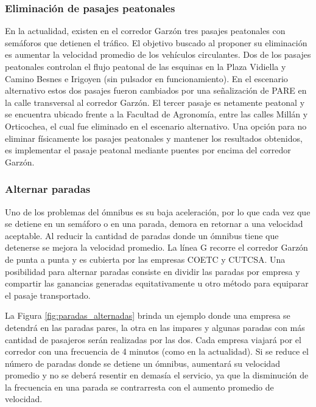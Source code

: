 \subsubsection{Eliminación de pasajes peatonales}
En la actualidad, existen en el corredor Garzón tres pasajes peatonales con semáforos que detienen el tráfico. El objetivo buscado al proponer su eliminación es aumentar la velocidad promedio de los vehículos circulantes. Dos de los pasajes peatonales controlan el flujo peatonal de las esquinas en la Plaza Vidiella y Camino Besnes e Irigoyen (sin pulsador en funcionamiento). En el escenario alternativo estos dos pasajes fueron cambiados por una señalización de {PARE} en la calle transversal al corredor Garzón. El tercer pasaje es netamente peatonal y se encuentra ubicado frente a la Facultad de Agronomía, entre las calles Millán y Orticochea, el cual fue eliminado en el escenario alternativo. Una opción para no eliminar físicamente los pasajes peatonales y mantener los resultados obtenidos, es implementar el pasaje peatonal mediante puentes por encima del corredor Garzón.

\subsubsection{Alternar paradas}

Uno de los problemas del ómnibus es su baja aceleración, por lo que cada vez que se detiene en un semáforo o en una parada, demora en retornar a una velocidad aceptable. Al reducir la cantidad de paradas donde un ómnibus tiene que detenerse se mejora la velocidad promedio.
La línea G recorre el corredor Garzón de punta a punta y es cubierta por las empresas COETC y CUTCSA. Una posibilidad para alternar paradas consiste en dividir las paradas por empresa y compartir las ganancias generadas equitativamente u otro método para equiparar el pasaje transportado. 

La Figura \ref{fig:paradas_alternadas} brinda un ejemplo donde una empresa se detendrá en las paradas pares, la otra en las impares y algunas paradas con más cantidad de pasajeros serán realizadas por las dos. Cada empresa viajará por el corredor con una frecuencia de 4 minutos (como en la actualidad). Si se reduce el número de paradas donde se detiene un ómnibus, aumentará su velocidad promedio y no se deberá resentir en demasía el servicio, ya que la disminución de la frecuencia en una parada se contrarresta con el aumento promedio de velocidad.



